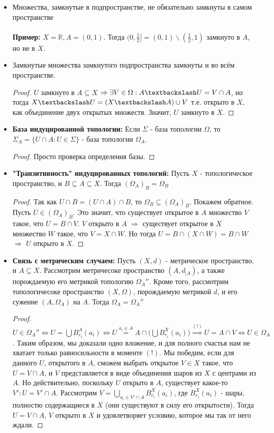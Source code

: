 \documentclass[a4paper,100pt]{article}
\theoremstyle{indented}
\begin{document}
\begin{itemize}
    \item Множества, замкнутые в подпространстве, не обязательно замкнуты в самом пространстве
    \\
    \\
    \textbf{Пример:} $X=\mathbb{R}, A=(0, 1)$. Тогда $(0, \frac{1}{2}]=(0, 1) \backslash (\frac{1}{2}, 1)$ замкнуто в $A$, но не в $X$.
    \item Замкнутые множества замкнутого подпространства замкнуты и во всём пространстве.
    \begin{proof} $U$ замкнуто в $A \subseteq X$ $\Rightarrow \exists V \in \Omega : A \textbackslash U=V \cap A$, но тогда $X \textbackslash U = (X \textbackslash A) \cup V$ т.е. открыто в $X$, как объединение двух открытых множеств. Значит, $U$ замкнуто в $X$.
    \end{proof}
    \item \textbf{База индуцированной топологии:} Если $\Sigma$ - база топологии $\Omega$, то $\Sigma_A=\{U \cap A : U \in \Sigma\}$ - база топологии $\Omega_A$.
    \begin{proof}
    Просто проверка определения базы.
    \end{proof}
    \item \textbf{"Транзитивность" индуцированных топологий:} Пусть $X$ - топологическое пространство, и $B \subseteq A \subseteq X$. Тогда $(\Omega_A)_B=\Omega_B$
    \begin{proof}
    Так как $U \cap B = (U \cap A) \cap B$, то $\Omega_B \subseteq (\Omega_A)_B$. Покажем обратное. Пусть $U \in (\Omega_A)_B$. Это значит, что существует открытое в $A$ множество $V$ такое, что $U=B \cap V$. $V$ открыто в $A$ $\Rightarrow$ существует открытое в $X$ множество $W$ такое, что $V=X \cap W$. Но тогда $U=B \cap (X \cap W) = B \cap W$ $\Rightarrow$ $U$ открыто в $X$.
    \end{proof}
    \item \textbf{Связь с метрическим случаем:} Пусть $(X, d)$ - метрическое пространство, и $A \subseteq X$. Рассмотрим метричесоке пространство $(A, d_{|A})$, а также порождаемую его метрикой топологию $\Omega_A''$. Кроме того, рассмотрим топологичесоке пространство  $(X, \Omega)$, порождаемую метрикой $d$, и его сужение $(A, \Omega_A)$ на $A$. Тогда $\Omega_A=\Omega_A''$
    \begin{proof}
    $U \in \Omega_A'' \Longleftrightarrow U = \bigcup B_{r_i}^A(a_i) \Longleftrightarrow U \overset{a_i \in A}{=} A \cap \Big ( \bigcup B_{r_i}^X(a_i) \Big ) \overset{(!)}{\Longrightarrow} U=A \cap V \Longleftrightarrow U \in \Omega_A$. Таким образом, мы доказали одно вложение, и для полного счастья нам не хватает только равносильности в моменте $(!)$. Мы победим, если для данного $U$, открытого в $A$, сможем выбрать открытое $V \in X$ такое, что $U=V \cap A$, и $V$ представляется в виде объединения шаров из $X$ с центрами из $A$. Но действительно, поскольку $U$ открыто в $A$, существует какое-то $V' : U=V' \cap A$. Рассмотрим $V= \bigcup_{a_i \in V' \cap A} B_{r_i}^X(a_i)$, где $B_{r_i}^X(a_i)$ - шары, полностю содержащиеся в $X$ (они существуют в силу его открытости). Тогда $U=V \cap A$, $V$ открыто в $X$ и удовлетворяет условию, которое мы так от него ждали.

\end{proof}
\end{itemize}
\end{document}
